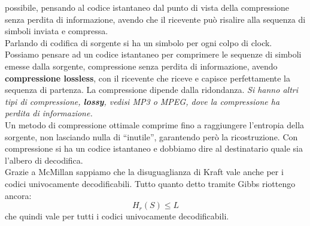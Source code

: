 \documentclass[a4paper,12pt, oneside]{book}
\begin{document}
possibile, pensando al codice istantaneo dal punto di vista della compressione
senza perdita di informazione, avendo che il ricevente può risalire alla
sequenza di simboli inviata e compressa.\\
Parlando di codifica di sorgente si ha un simbolo per ogni colpo di
clock. Possiamo pensare ad un codice istantaneo per comprimere le sequenze di
simboli emesse dalla sorgente, compressione senza perdita di informazione,
avendo \textbf{compressione lossless}, con il
ricevente che riceve e capisce perfettamente la sequenza di partenza. La
compressione dipende dalla ridondanza.
\textit{Si hanno altri tipi di compressione, \textbf{lossy}, vedisi MP3 o MPEG,
  dove la compressione ha perdita di informazione.}\\
Un metodo di compressione ottimale comprime fino a raggiungere l'entropia della
sorgente, non lasciando nulla di ``inutile'', garantendo però la
ricostruzione. Con compressione si ha un codice istantaneo e dobbiamo dire al
destinatario quale sia l'albero di decodifica. \\
Grazie a McMillan sappiamo che la disuguaglianza di Kraft vale anche per i
codici univocamente decodificabili. Tutto quanto detto tramite Gibbs riottengo
ancora:
\[H_r(S)\leq L\]
che quindi vale per tutti i codici univocamente decodificabili.\\
\end{document}
